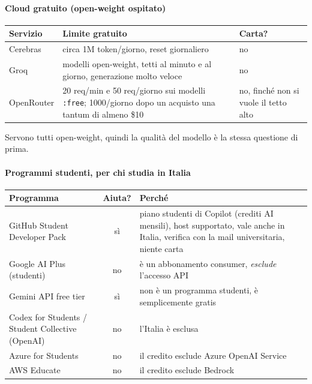 \documentclass[a4paper,12pt]{article}
\begin{document}
\paragraph{Cloud gratuito (open-weight ospitato)}
\begin{center}
\begin{tabular}{|l|p{6.5cm}|p{4cm}|}
\hline
\textbf{Servizio} & \textbf{Limite gratuito} & \textbf{Carta?}\\
\hline
Cerebras & circa 1M token/giorno, reset giornaliero & no\\
Groq & modelli open-weight, tetti al minuto e al giorno, generazione molto veloce & no\\
OpenRouter & 20 req/min e 50 req/giorno sui modelli \texttt{:free}; 1000/giorno dopo un acquisto una tantum di almeno \$10 & no, finché non si vuole il tetto alto\\
\hline
\end{tabular}
\end{center}
Servono tutti open-weight, quindi la qualità del modello è la stessa questione di prima.

\paragraph{Programmi studenti, per chi studia in Italia}
\begin{center}
\begin{tabular}{|l|c|p{8cm}|}
\hline
\textbf{Programma} & \textbf{Aiuta?} & \textbf{Perché}\\
\hline
GitHub Student Developer Pack & sì & piano studenti di Copilot (crediti AI mensili), host supportato, vale anche in Italia, verifica con la mail universitaria, niente carta\\
Google AI Plus (studenti) & no & è un abbonamento consumer, \emph{esclude} l'accesso API\\
Gemini API free tier & sì & non è un programma studenti, è semplicemente gratis\\
Codex for Students / Student Collective (OpenAI) & no & l'Italia è esclusa\\
Azure for Students & no & il credito esclude Azure OpenAI Service\\
AWS Educate & no & il credito esclude Bedrock\\
\hline
\end{tabular}
\end{center}
\end{document}
